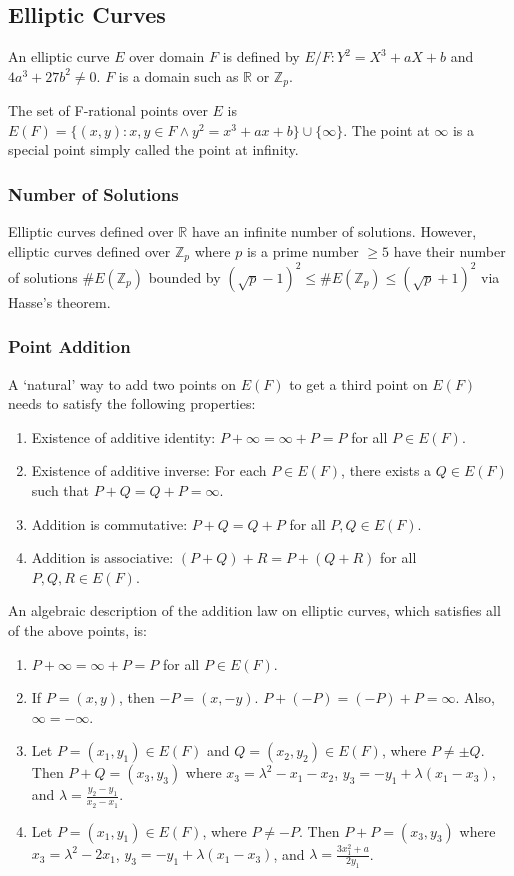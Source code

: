 \documentclass[12pt,titlepage]{article}
\begin{document}
    \subsection{Elliptic Curves}
      An elliptic curve $E$ over domain $F$ is defined by $E/F: Y^2 = X^3 + aX + b$ and $4a^3 + 27b^2 \neq 0$.
      $F$ is a domain such as $\mathbb{R}$ or $\mathbb{Z}_p$.

      The set of F-rational points over $E$ is $E(F) = \{(x, y): x, y \in F \land y^2 = x^3 + ax + b\} \cup \{\infty\}$.
      The point at $\infty$ is a special point simply called the point at infinity.

      \subsubsection{Number of Solutions}
        Elliptic curves defined over $\mathbb{R}$ have an infinite number of solutions. However, elliptic curves defined over
        $\mathbb{Z}_p$ where $p$ is a prime number $\geq 5$ have their number of solutions $\#E(\mathbb{Z}_p)$ bounded by
        $(\sqrt{p} - 1)^2 \leq \#E(\mathbb{Z}_p) \leq (\sqrt{p} + 1)^2$ via Hasse's theorem.

      \subsubsection{Point Addition}
        A `natural' way to add two points on $E(F)$ to get a third point on $E(F)$ needs to satisfy the following properties:
        \begin{enumerate}
          \item Existence of additive identity: $P + \infty = \infty + P = P$ for all $P \in E(F)$.
          \item Existence of additive inverse: For each $P \in E(F)$, there exists a $Q \in E(F)$ such that $P + Q = Q + P = \infty$.
          \item Addition is commutative: $P + Q = Q + P$ for all $P, Q \in E(F)$.
          \item Addition is associative: $(P + Q) + R = P + (Q + R)$ for all $P, Q, R \in E(F)$.
        \end{enumerate}

        An algebraic description of the addition law on elliptic curves, which satisfies all of the above points, is:
        \begin{enumerate}
          \item $P + \infty = \infty + P = P$ for all $P \in E(F)$.
          \item If $P = (x, y)$, then $-P = (x, -y)$. $P + (-P) = (-P) + P = \infty$. Also, $\infty = -\infty$.
          \item Let $P = (x_1, y_1) \in E(F)$ and $Q = (x_2, y_2) \in E(F)$, where $P \neq \pm Q$. Then $P + Q = (x_3, y_3)$ where
            $x_3 = \lambda^2 -  x_1 - x_2$, $y_3 = -y_1 + \lambda(x_1 - x_3)$, and $\lambda = \frac{y_2 - y_1}{x_2 - x_1}$.
          \item Let $P = (x_1, y_1) \in E(F)$, where $P \neq -P$. Then $P + P = (x_3, y_3)$ where $x_3 = \lambda^2 - 2x_1$,
            $y_3 = -y_1 + \lambda(x_1 - x_3)$, and $\lambda = \frac{3x_1^2 + a}{2y_1}$.
        \end{enumerate}
\end{document}
